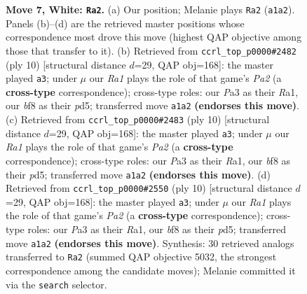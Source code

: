 \documentclass[11pt]{article}
\begin{document}
\begin{figure}[p]
\caption{\textbf{Move 7, White: \texttt{Ra2}.} (a) Our position; Melanie plays \texttt{Ra2} (\texttt{a1a2}). Panels (b)--(d) are the retrieved master positions whose correspondence most drove this move (highest QAP objective among those that transfer to it). (b) Retrieved from \texttt{ccrl\_top\_p0000\#2482} (ply 10) [structural distance $d$=29, QAP obj=168]: the master played \texttt{a3}; under $\mu$ our \emph{Ra1} plays the role of that game's \emph{Pa2} (a \textbf{cross-type} correspondence); cross-type roles: our \emph{P}a3 as their \emph{R}a1, our \emph{b}f8 as their \emph{p}d5; transferred move \texttt{a1a2} \textbf{(endorses this move)}. (c) Retrieved from \texttt{ccrl\_top\_p0000\#2483} (ply 10) [structural distance $d$=29, QAP obj=168]: the master played \texttt{a3}; under $\mu$ our \emph{Ra1} plays the role of that game's \emph{Pa2} (a \textbf{cross-type} correspondence); cross-type roles: our \emph{P}a3 as their \emph{R}a1, our \emph{b}f8 as their \emph{p}d5; transferred move \texttt{a1a2} \textbf{(endorses this move)}. (d) Retrieved from \texttt{ccrl\_top\_p0000\#2550} (ply 10) [structural distance $d$=29, QAP obj=168]: the master played \texttt{a3}; under $\mu$ our \emph{Ra1} plays the role of that game's \emph{Pa2} (a \textbf{cross-type} correspondence); cross-type roles: our \emph{P}a3 as their \emph{R}a1, our \emph{b}f8 as their \emph{p}d5; transferred move \texttt{a1a2} \textbf{(endorses this move)}. Synthesis: 30 retrieved analogs transferred to \texttt{Ra2} (summed QAP objective 5032, the strongest correspondence among the candidate moves); Melanie committed it via the \texttt{search} selector.}
\label{fig:thought-m12}
\end{figure}

\clearpage
\end{document}
